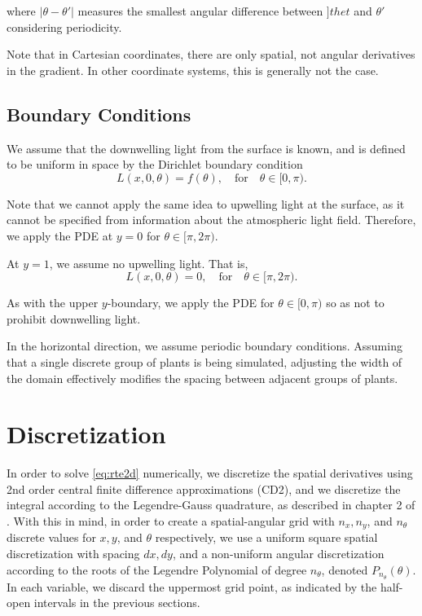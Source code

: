 \documentclass[10pt]{article}
\newcommand\abs[1]{\left| #1 \right|}
\begin{document}
\begin{multicols}{2}
where $\abs{\theta-\theta'}$ measures the smallest angular difference between $]thet$ and $\theta'$ considering periodicity.

Note that in Cartesian coordinates, there are only spatial, not angular derivatives in the gradient.
In other coordinate systems, this is generally not the case.
	
\subsection{Boundary Conditions}
We assume that the downwelling light from the surface is known, and is defined to be uniform in space by the Dirichlet boundary condition 
\begin{equation}
	L(x,0,\theta) = f(\theta), \quad \mbox{for} \quad \theta \in [0,\pi).
	\label{eq:surf_bc}
\end{equation}

Note that we cannot apply the same idea to upwelling light at the surface, as it cannot be specified from information about the atmospheric light field.
Therefore, we apply the PDE at $y=0$ for $\theta \in [\pi,2\pi)$.

At $y=1$, we assume no upwelling light.
That is,
\begin{equation}
	L(x,0,\theta) = 0, \quad \mbox{for} \quad \theta \in [\pi,2\pi).
	\label{eq:bottom_bc}
\end{equation}

As with the upper $y$-boundary, we apply the PDE for $\theta \in [0,\pi)$ so as not to prohibit downwelling light.

In the horizontal direction, we assume periodic boundary conditions.
Assuming that a single discrete group of plants is being simulated, adjusting the width of the domain effectively modifies the spacing between adjacent groups of plants.

\section{Discretization}
In order to solve \eqref{eq:rte2d} numerically, we discretize the spatial derivatives using 2nd order central finite difference approximations (CD2), and we discretize the integral according to the Legendre-Gauss quadrature, as described in chapter 2 of \citet{chandrasekhar_radiative_1960}.
With this in mind, in order to create a spatial-angular grid with $n_x,n_y$, and $n_\theta$ discrete values for $x, y$, and $\theta$ respectively, we use a uniform square spatial discretization with spacing $dx, dy$, and a non-uniform angular discretization according to the roots of the Legendre Polynomial of degree $n_\theta$, denoted $P_{n_\theta}(\theta)$.
In each variable, we discard the uppermost grid point, as indicated by the half-open intervals in the previous sections.


\end{multicols}
\end{document}
